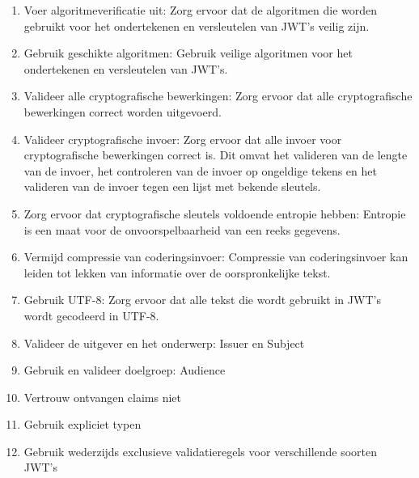 \begin{enumerate}[label=\textbf{-}]
  \item Voer algoritmeverificatie uit: Zorg ervoor dat de algoritmen die worden gebruikt voor het ondertekenen en versleutelen van JWT's veilig zijn.
  \item Gebruik geschikte algoritmen: Gebruik veilige algoritmen voor het ondertekenen en versleutelen van JWT's.
  \item Valideer alle cryptografische bewerkingen: Zorg ervoor dat alle cryptografische bewerkingen correct worden uitgevoerd.
  \item Valideer cryptografische invoer: Zorg ervoor dat alle invoer voor cryptografische bewerkingen correct is. Dit omvat het valideren van de lengte van de invoer, het controleren van de invoer op ongeldige tekens en het valideren van de invoer tegen een lijst met bekende sleutels.
  \item Zorg ervoor dat cryptografische sleutels voldoende entropie hebben: Entropie is een maat voor de onvoorspelbaarheid van een reeks gegevens.
  \item Vermijd compressie van coderingsinvoer: Compressie van coderingsinvoer kan leiden tot lekken van informatie over de oorspronkelijke tekst.
  \item Gebruik UTF-8: Zorg ervoor dat alle tekst die wordt gebruikt in JWT's wordt gecodeerd in UTF-8.
  \item Valideer de uitgever en het onderwerp: Issuer en Subject
  \item Gebruik en valideer doelgroep: Audience
  \item Vertrouw ontvangen claims niet
  \item Gebruik expliciet typen
  \item Gebruik wederzijds exclusieve validatieregels voor verschillende soorten JWT's
\end{enumerate}
\autocite{Sheffer2020}


